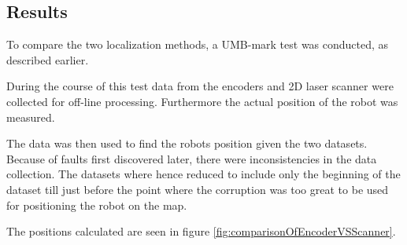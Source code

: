 \subsection{Results}
To compare the two localization methods, a UMB-mark test was conducted, as described earlier.

%

During the course of this test data from the encoders and 2D laser scanner were collected for off-line processing. 
Furthermore the actual position of the robot was measured.

The data was then used to find the robots position given the two datasets. 
Because of faults first discovered later, there were inconsistencies in the data collection.
The datasets where hence reduced to include only the beginning of the dataset till just before the point where the corruption was too great to be used for positioning the robot on the map.

The positions calculated are seen in figure \ref{fig:comparisonOfEncoderVSScanner}. 



